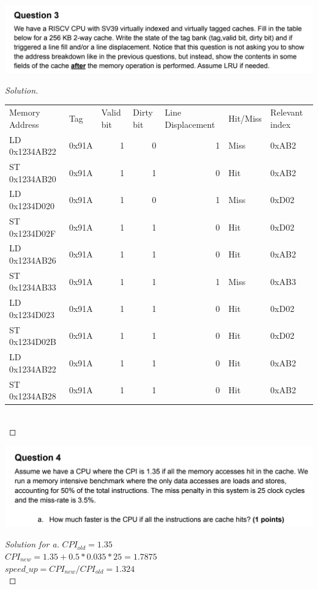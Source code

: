 \documentclass[12pt]{article}
\begin{document}
\includegraphics[scale=0.37]{q3_q.png}\\
\begin{proof}[Solution]
	\ \\
    \begin{tabular}{llrrrll}
	Memory Address & Tag   & \multicolumn{1}{l}{Valid bit} & \multicolumn{1}{l}{Dirty bit} & \multicolumn{1}{l}{Line Displacement} & Hit/Miss & Relevant index \\
	LD 0x1234AB22 & 0x91A & 1     & 0     & 1     & Miss  & 0xAB2 \\
	ST 0x1234AB20 & 0x91A & 1     & 1     & 0     & Hit   & 0xAB2 \\
	LD 0x1234D020 & 0x91A & 1     & 0     & 1     & Miss  & 0xD02 \\
	ST 0x1234D02F & 0x91A & 1     & 1     & 0     & Hit   & 0xD02 \\
	LD 0x1234AB26 & 0x91A & 1     & 1     & 0     & Hit   & 0xAB2 \\
	ST 0x1234AB33 & 0x91A & 1     & 1     & 1     & Miss  & 0xAB3 \\
	LD 0x1234D023 & 0x91A & 1     & 1     & 0     & Hit   & 0xD02 \\
	ST 0x1234D02B & 0x91A & 1     & 1     & 0     & Hit   & 0xD02 \\
	LD 0x1234AB22 & 0x91A & 1     & 1     & 0     & Hit   & 0xAB2 \\
	ST 0x1234AB28 & 0x91A & 1     & 1     & 0     & Hit   & 0xAB2 \\
	\end{tabular}\\
\end{proof}
\includegraphics[scale=0.37]{q4_a.png}\\
\begin{proof}[Solution for a]
	$CPI_{old} = 1.35$\\
	$CPI_{new} = 1.35 + 0.5 * 0.035 * 25 = 1.7875$\\
	$speed\_up = CPI_{new} / CPI_{old} = 1.324$\\
\end{proof}
\end{document}
